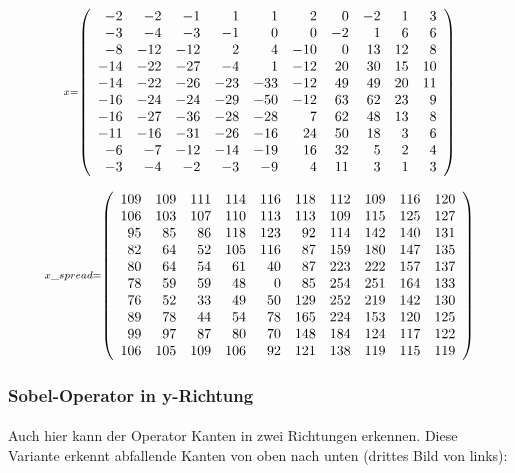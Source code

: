 \documentclass[11pt]{article}
\begin{document}
    
    \[\scriptstyle x =  \def\g{\color{lightgray}}\left(\begin{array}{rrrrrrrrrr}-2 & -2 & -1 & 1 & 1 & 2 & 0 & -2 & 1 & 3\\-3 & -4 & -3 & -1 & 0 & 0 & -2 & 1 & 6 & 6\\-8 & -12 & -12 & 2 & 4 & -10 & 0 & 13 & 12 & 8\\-14 & -22 & -27 & -4 & 1 & -12 & 20 & 30 & 15 & 10\\-14 & -22 & -26 & -23 & -33 & -12 & 49 & 49 & 20 & 11\\-16 & -24 & -24 & -29 & -50 & -12 & 63 & 62 & 23 & 9\\-16 & -27 & -36 & -28 & -28 & 7 & 62 & 48 & 13 & 8\\-11 & -16 & -31 & -26 & -16 & 24 & 50 & 18 & 3 & 6\\-6 & -7 & -12 & -14 & -19 & 16 & 32 & 5 & 2 & 4\\-3 & -4 & -2 & -3 & -9 & 4 & 11 & 3 & 1 & 3\end{array}\right)\]

    \[\scriptstyle x\_spread =  \def\g{\color{lightgray}}\left(\begin{array}{rrrrrrrrrr}109 & 109 & 111 & 114 & 116 & 118 & 112 & 109 & 116 & 120\\106 & 103 & 107 & 110 & 113 & 113 & 109 & 115 & 125 & 127\\95 & 85 & 86 & 118 & 123 & 92 & 114 & 142 & 140 & 131\\82 & 64 & 52 & 105 & 116 & 87 & 159 & 180 & 147 & 135\\80 & 64 & 54 & 61 & 40 & 87 & 223 & 222 & 157 & 137\\78 & 59 & 59 & 48 & 0 & 85 & 254 & 251 & 164 & 133\\76 & 52 & 33 & 49 & 50 & 129 & 252 & 219 & 142 & 130\\89 & 78 & 44 & 54 & 78 & 165 & 224 & 153 & 120 & 125\\99 & 97 & 87 & 80 & 70 & 148 & 184 & 124 & 117 & 122\\106 & 105 & 109 & 106 & 92 & 121 & 138 & 119 & 115 & 119\end{array}\right)\]

\newpage    
    \hypertarget{sobel-operator-in-y-richtung}{%
\subsubsection*{Sobel-Operator in
y-Richtung}\label{sobel-operator-in-y-richtung}}

    \paragraph{}
    Auch hier kann der Operator Kanten in zwei Richtungen erkennen. Diese Variante erkennt abfallende Kanten von oben nach unten (drittes Bild von links):
\end{document}
